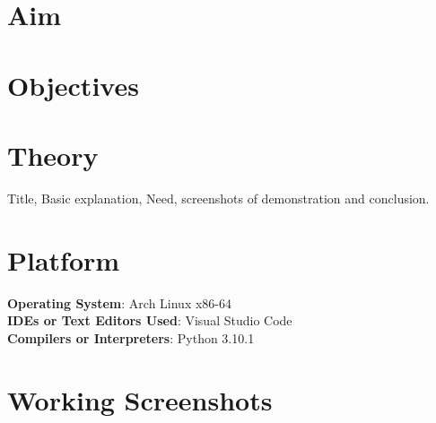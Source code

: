\documentclass[11pt]{article}
\begin{document}
\tableofcontents
\thispagestyle{empty}
\clearpage

\setcounter{page}{1}

\section{Aim}

\section{Objectives}


\section{Theory}
Title, Basic explanation, Need, screenshots of demonstration and conclusion. 
\section{Platform}
\textbf{Operating System}: Arch Linux x86-64 \\
\textbf{IDEs or Text Editors Used}: Visual Studio Code\\
\textbf{Compilers or Interpreters}: Python 3.10.1\\

\section{Working Screenshots}
\end{document}
